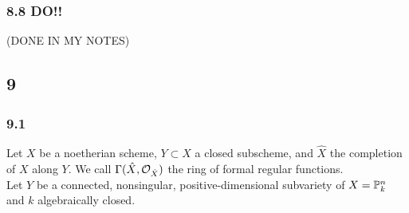 \documentclass[12pt]{article}
\begin{document}
\subsubsection{8.8 DO!!}

(DONE IN MY NOTES)

\subsection{9}


\newcommand{\fX}{\mathfrak{X}}
\newcommand{\fU}{\mathfrak{U}}
\newcommand{\fF}{\mathfrak{F}}
\newcommand{\fJ}{\mathfrak{J}}
\newcommand{\fL}{\mathfrak{L}}

\subsubsection{9.1}

Let $X$ be a noetherian scheme, $Y \subset X$ a closed subscheme, and $\hat{X}$ the completion of $X$ along $Y$. We call $\Gamma(\hat{X}, \struct{\hat{X}})$ the ring of formal regular functions.
\bigskip\\
Let $Y$ be a connected, nonsingular, positive-dimensional subvariety of $X = \P^n_k$ and $k$ algebraically closed.
\end{document}
